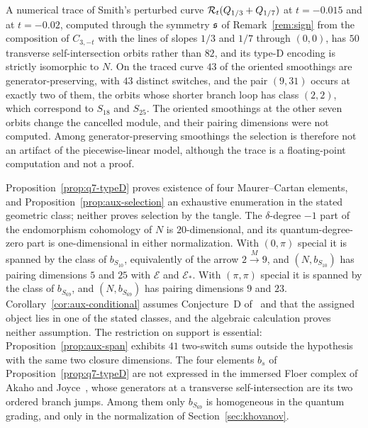 \begin{remark}\label{rem:analytic}
A numerical trace of Smith's perturbed curve $\mathcal{R}_t(Q_{1/3}+Q_{1/7})$ at $t=-0.015$ and at $t=-0.02$,
computed through the symmetry $\mathfrak{s}$ of Remark~\ref{rem:sign} from the composition of $C_{3,-t}$ with the
lines of slopes $1/3$ and $1/7$ through $(0,0)$, has $50$ transverse self-intersection orbits rather
than $82$, and its type-D encoding is strictly isomorphic to $N$.  On the traced curve $43$ of the
oriented smoothings are generator-preserving, with $43$ distinct switches, and the pair $(9,31)$ occurs at
exactly two of them, the orbits whose shorter branch loop has class $(2,2)$, which correspond to
$S_{18}$ and $S_{25}$.  The oriented smoothings at the other seven orbits change the cancelled module, and
their pairing dimensions were not computed.  Among generator-preserving smoothings the selection is therefore not an artifact of
the piecewise-linear model, although the trace is a floating-point computation and not a proof.
\end{remark}

\begin{remark}[Scope]\label{rem:q7-scope}
Proposition~\ref{prop:q7-typeD} proves existence of four Maurer--Cartan elements, and
Proposition~\ref{prop:aux-selection} an exhaustive enumeration in the stated geometric class; neither
proves selection by the tangle.  The $\delta$-degree $-1$ part of the endomorphism cohomology of $N$ is
$20$-dimensional, and its quantum-degree-zero part is one-dimensional in either normalization.  With $(0,\pi)$
special it is spanned by the class of $b_{S_{10}}$, equivalently of the arrow $2\xrightarrow M9$, and
$(N,b_{S_{10}})$ has pairing dimensions $5$ and $25$ with $\mathcal E$ and $\mathcal E_*$.  With $(\pi,\pi)$
special it is spanned by the class of $b_{S_{69}}$, and $(N,b_{S_{69}})$ has pairing dimensions $9$ and $23$.
Corollary~\ref{cor:aux-conditional} assumes Conjecture~D of~\cite{CHKK} and that the assigned object lies
in one of the stated classes, and the algebraic calculation proves neither assumption.  The restriction
on support is essential: Proposition~\ref{prop:aux-span} exhibits $41$ two-switch sums outside the
hypothesis with the same two closure dimensions.  The four elements $b_s$ of
Proposition~\ref{prop:q7-typeD} are not expressed in the immersed Floer complex of Akaho and
Joyce~\cite{AkahoJoyce}, whose generators at a transverse self-intersection are its two ordered branch
jumps.  Among them only $b_{S_{69}}$ is homogeneous in the quantum grading, and only in the normalization of
Section~\ref{sec:khovanov}.
\end{remark}


